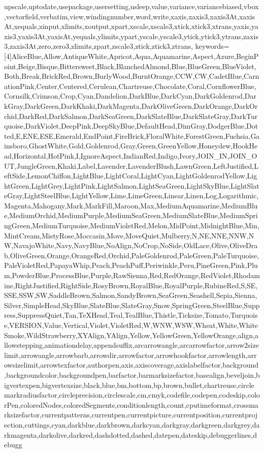 {upscale,uptodate,usepackage,usersetting,usleep,value,variance,variancebiased,vbox,vectorfield,verbatim,view,windingnumber,word,write,xaxis,xaxis3,xaxis3At,xaxisAt,xequals,xinput,xlimits,xoutput,xpart,xscale,xscale3,xtick,xtick3,xtrans,yaxis,yaxis3,yaxis3At,yaxisAt,yequals,ylimits,ypart,yscale,yscale3,ytick,ytick3,ytrans,zaxis3,zaxis3At,zero,zero3,zlimits,zpart,zscale3,ztick,ztick3,ztrans},
  keywords=[4]{AliceBlue,Allow,AntiqueWhite,Apricot,Aqua,Aquamarine,Aspect,Azure,BeginPoint,Beige,Bisque,Bittersweet,Black,BlanchedAlmond,Blue,BlueGreen,BlueViolet,Both,Break,BrickRed,Brown,BurlyWood,BurntOrange,CCW,CW,CadetBlue,CarnationPink,Center,Centered,Cerulean,Chartreuse,Chocolate,Coral,CornflowerBlue,Cornsilk,Crimson,Crop,Cyan,Dandelion,DarkBlue,DarkCyan,DarkGoldenrod,DarkGray,DarkGreen,DarkKhaki,DarkMagenta,DarkOliveGreen,DarkOrange,DarkOrchid,DarkRed,DarkSalmon,DarkSeaGreen,DarkSlateBlue,DarkSlateGray,DarkTurquoise,DarkViolet,DeepPink,DeepSkyBlue,DefaultHead,DimGray,DodgerBlue,Dotted,E,ENE,ESE,Emerald,EndPoint,FireBrick,FloralWhite,ForestGreen,Fuchsia,Gainsboro,GhostWhite,Gold,Goldenrod,Gray,Green,GreenYellow,Honeydew,HookHead,Horizontal,HotPink,I,IgnoreAspect,IndianRed,Indigo,Ivory,JOIN_IN,JOIN_OUT,JungleGreen,Khaki,Label,Lavender,LavenderBlush,LawnGreen,LeftJustified,LeftSide,LemonChiffon,LightBlue,LightCoral,LightCyan,LightGoldenrodYellow,LightGreen,LightGrey,LightPink,LightSalmon,LightSeaGreen,LightSkyBlue,LightSlateGray,LightSteelBlue,LightYellow,Lime,LimeGreen,Linear,Linen,Log,Logarithmic,Magenta,Mahogany,Mark,MarkFill,Maroon,Max,MediumAquamarine,MediumBlue,MediumOrchid,MediumPurple,MediumSeaGreen,MediumSlateBlue,MediumSpringGreen,MediumTurquoise,MediumVioletRed,Melon,MidPoint,MidnightBlue,Min,MintCream,MistyRose,Moccasin,Move,MoveQuiet,Mulberry,N,NE,NNE,NNW,NW,NavajoWhite,Navy,NavyBlue,NoAlign,NoCrop,NoSide,OldLace,Olive,OliveDrab,OliveGreen,Orange,OrangeRed,Orchid,PaleGoldenrod,PaleGreen,PaleTurquoise,PaleVioletRed,PapayaWhip,Peach,PeachPuff,Periwinkle,Peru,PineGreen,Pink,Plum,PowderBlue,ProcessBlue,Purple,RawSienna,Red,RedOrange,RedViolet,Rhodamine,RightJustified,RightSide,RosyBrown,RoyalBlue,RoyalPurple,RubineRed,S,SE,SSE,SSW,SW,SaddleBrown,Salmon,SandyBrown,SeaGreen,Seashell,Sepia,Sienna,Silver,SimpleHead,SkyBlue,SlateBlue,SlateGray,Snow,SpringGreen,SteelBlue,Suppress,SuppressQuiet,Tan,TeXHead,Teal,TealBlue,Thistle,Ticksize,Tomato,Turquoise,VERSION,Value,Vertical,Violet,VioletRed,W,WNW,WSW,Wheat,White,WhiteSmoke,WildStrawberry,XYAlign,YAlign,Yellow,YellowGreen,YellowOrange,align,allowstepping,animationdelay,appendsuffix,arcarrowangle,arcarrowfactor,arrow2sizelimit,arrowangle,arrowbarb,arrowdir,arrowfactor,arrowhookfactor,arrowlength,arrowsizelimit,arrowtexfactor,authorpen,axis,axiscoverage,axislabelfactor,background,backgroundcolor,backgroundpen,barfactor,barmarksizefactor,basealign,beveljoin,bigvertexpen,bigvertexsize,black,blue,bm,bottom,bp,brown,bullet,chartreuse,circlemarkradiusfactor,circleprecision,circlescale,cm,cmyk,codefile,codepen,codeskip,colorPen,coloredNodes,coloredSegments,conditionlength,count,cputimeformat,crossmarksizefactor,currentpatterns,currentpen,currentpicture,currentposition,currentprojection,cuttings,cyan,darkblue,darkbrown,darkcyan,darkgray,darkgreen,darkgrey,darkmagenta,darkolive,darkred,dashdotted,dashed,datepen,dateskip,debuggerlines,debugg}

